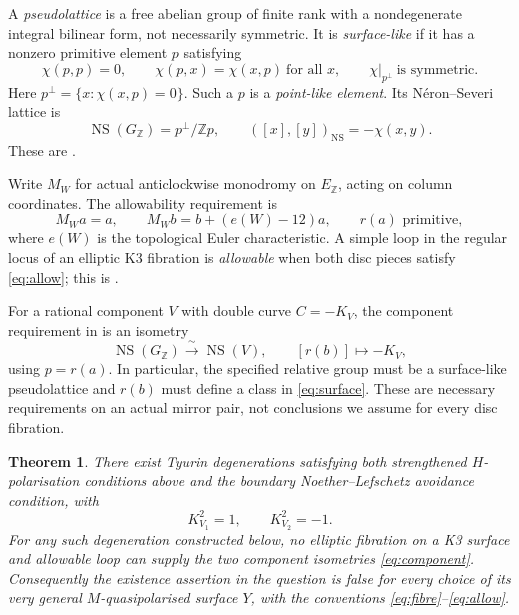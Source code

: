 \documentclass[11pt]{article}
\newtheorem{theorem}{Theorem}[section]
\theoremstyle{definition}
\theoremstyle{remark}
\newcommand{\Z}{\mathbb Z}
\newcommand{\NS}{\operatorname{NS}}
\begin{document}

A \emph{pseudolattice} is a free abelian group of finite rank with a nondegenerate integral bilinear form, not necessarily symmetric. It is \emph{surface-like} if it has a nonzero primitive element $p$ satisfying
\[
\chi(p,p)=0,\qquad \chi(p,x)=\chi(x,p)\ \text{for all }x,
\qquad \chi|_{p^\perp}\ \text{is symmetric}.
\]
Here $p^\perp=\{x:\chi(x,p)=0\}$. Such a $p$ is a \emph{point-like element}. Its N\'eron--Severi lattice is
\begin{equation}\label{eq:surface}
\NS(G_{\Z})=p^\perp/\Z p,\qquad
([x],[y])_{\NS}=-\chi(x,y).
\end{equation}
These are \cite[Definitions~2.5--2.6]{GT}.

Write $M_W$ for actual anticlockwise monodromy on $E_{\Z}$, acting on column coordinates. The allowability requirement is
\begin{equation}\label{eq:allow}
M_Wa=a,\qquad M_Wb=b+(e(W)-12)a,\qquad r(a)\text{ primitive},
\end{equation}
where $e(W)$ is the topological Euler characteristic. A simple loop in the regular locus of an elliptic K3 fibration is \emph{allowable} when both disc pieces satisfy \eqref{eq:allow}; this is \cite[Assumption~4.9 and Definition~4.11]{GT}.

For a rational component $V$ with double curve $C=-K_V$, the component requirement in \cite[Definition~5.1(2)]{GT} is an isometry
\begin{equation}\label{eq:component}
\NS(G_{\Z})\xrightarrow{\ \sim\ }\NS(V),\qquad [r(b)]\longmapsto -K_V,
\end{equation}
using $p=r(a)$. In particular, the specified relative group must be a surface-like pseudolattice and $r(b)$ must define a class in \eqref{eq:surface}. These are necessary requirements on an actual mirror pair, not conclusions we assume for every disc fibration.

\begin{theorem}\label{thm:main}
There exist Tyurin degenerations satisfying both strengthened $H$-polarisation conditions above and the boundary Noether--Lefschetz avoidance condition, with
\[
K_{V_1}^2=1,\qquad K_{V_2}^2=-1.
\]
For any such degeneration constructed below, no elliptic fibration on a K3 surface and allowable loop can supply the two component isometries \eqref{eq:component}. Consequently the existence assertion in the question is false for every choice of its very general $M$-quasipolarised surface $Y$, with the conventions \eqref{eq:fibre}--\eqref{eq:allow}.
\end{theorem}
\end{document}

